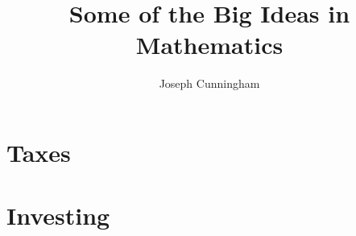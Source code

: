 \documentclass{report}
\title{Some of the Big Ideas in Mathematics}
\author{Joseph Cunningham}
\date{}
\begin{document}
\maketitle
\tableofcontents

\part{Taxes}
\setcounter{chapter}{0} %


\part{Investing}
\setcounter{chapter}{0} %

\end{document}
